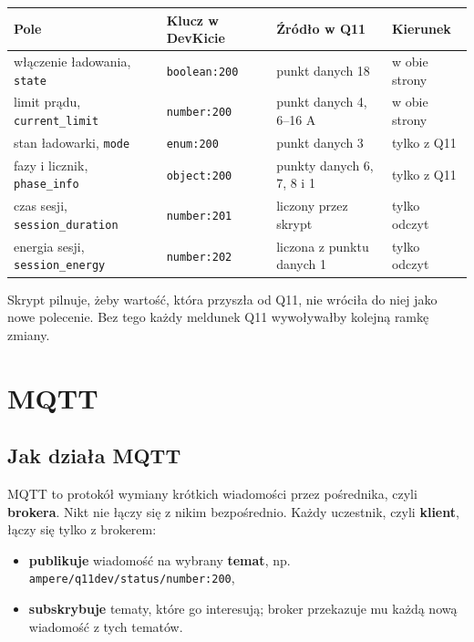 \documentclass[11pt,a4paper]{article}
\begin{document}
\begin{longtable}{>{\raggedright\arraybackslash}p{5.39cm}>{\raggedright\arraybackslash}p{2.74cm}>{\raggedright\arraybackslash}p{4.19cm}>{\raggedright\arraybackslash}p{2.52cm}}
\toprule
\rowcolor{apteallight}\textbf{Pole} & \textbf{Klucz w DevKicie} & \textbf{Źródło w Q11} & \textbf{Kierunek} \\
\midrule\endhead
\bottomrule\endfoot
włączenie ładowania, \texttt{state} & \texttt{boolean:200} & punkt danych 18 & w obie strony \\
limit prądu, \texttt{current\_\allowbreak{}limit} & \texttt{number:200} & punkt danych 4, 6–16 A & w obie strony \\
stan ładowarki, \texttt{mode} & \texttt{enum:200} & punkt danych 3 & tylko z Q11 \\
fazy i licznik, \texttt{phase\_info} & \texttt{object:200} & punkty danych 6, 7, 8 i 1 & tylko z Q11 \\
czas sesji, \texttt{session\_\allowbreak{}duration} & \texttt{number:201} & liczony przez skrypt & tylko odczyt \\
energia sesji, \texttt{session\_\allowbreak{}energy} & \texttt{number:202} & liczona z punktu danych 1 & tylko odczyt \\
\end{longtable}

Skrypt pilnuje, żeby wartość, która przyszła od Q11, nie wróciła do niej jako nowe polecenie. Bez tego każdy meldunek Q11 wywoływałby kolejną ramkę zmiany.


\clearpage

\section{MQTT}

\subsection{Jak działa MQTT}

MQTT to protokół wymiany krótkich wiadomości przez pośrednika, czyli \textbf{brokera}. Nikt nie łączy się z nikim bezpośrednio. Każdy uczestnik, czyli \textbf{klient}, łączy się tylko z brokerem:

\begin{itemize}
\item \textbf{publikuje} wiadomość na wybrany \textbf{temat}, np. \texttt{ampere/\allowbreak{}q11dev/\allowbreak{}status/\allowbreak{}number:\allowbreak{}200},
\item \textbf{subskrybuje} tematy, które go interesują; broker przekazuje mu każdą nową wiadomość z tych tematów.
\end{itemize}
\end{document}
